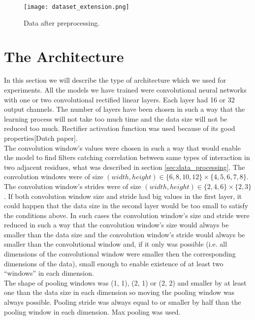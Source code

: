 \documentclass[a4paper,10pt]{report}
\begin{document}
	  \begin{figure}[h!]
	    \centering
	    \texttt{[image: dataset\_extension.png]}
	    \caption{Data after preprocessing.}
	    \label{fig:extended_data}
	  \end{figure} 
      
	
      \section{The Architecture}
      In this section we will describe the type of architecture which we used for experiments. All the models we have trained were convolutional neural networks with one or two convolutional rectified linear layers. Each layer had 16 or 32 output channels. The number of layers have been chosen in such a way that the learning process will not take too much time and the data size will not be reduced too much. Rectifier activation function was used because of its good properties[Dutch paper].\\ 
   
      The convolution window's values were chosen in such a way that would enable the model to find filters catching correlation between same types of interaction in two adjacent residues, what was described in section \ref{sec:data_processing}. The convolution windows were of size $(width, height) \in \{6, 8, 10, 12\} \times \{4, 5, 6, 7, 8\}$. The convolution window's strides were of size $(width, height) \in \{2, 4, 6\} \times \{2, 3\}$. If both convolution window size and stride had big values in the first layer, it could happen that the data size in the second layer would be too small to satisfy the conditions above. In such cases the convolution window's size and stride were reduced in such a way that the convolution window's size would always be smaller than the data size and the convolution window's stride would always be smaller than the convolutional window and, if it only was possible (i.e. all dimensions of the convolutional window were smaller then the corresponding dimensions of the data), small enough to enable existence of at least two ``windows'' in each dimension.\\
      
      The shape of pooling windows was (1, 1), (2, 1) or (2, 2) and smaller by at least one than the data size in each dimension so moving the pooling window was always possible. Pooling stride was always equal to or smaller by half than the pooling window in each dimension. Max pooling was used.\\
      
\end{document}
